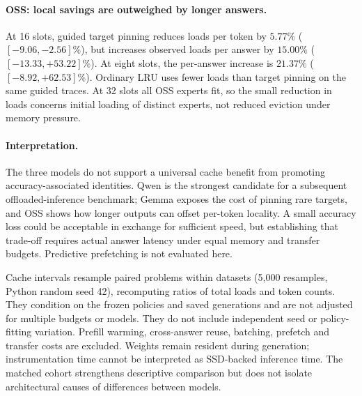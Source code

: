 \paragraph{OSS: local savings are outweighed by longer answers.}
At 16 slots, guided target pinning reduces loads per token by $5.77\%$
($[-9.06,-2.56]\%$), but increases observed loads per answer by $15.00\%$
($[-13.33,+53.22]\%$). At eight slots, the per-answer increase is
$21.37\%$ ($[-8.92,+62.53]\%$). Ordinary LRU uses fewer loads than target
pinning on the same guided traces. At 32 slots all OSS experts fit, so the
small reduction in loads concerns initial loading of distinct experts,
not reduced eviction under memory pressure.

\paragraph{Interpretation.}
The three models do not support a universal cache benefit from promoting
accuracy-associated identities. Qwen is the strongest candidate for a
subsequent offloaded-inference benchmark; Gemma exposes the cost of pinning
rare targets, and OSS shows how longer outputs can offset per-token locality.
A small accuracy loss could be acceptable in exchange for sufficient speed,
but establishing that trade-off requires actual answer latency under equal
memory and transfer budgets. Predictive prefetching is not evaluated here.

Cache intervals resample paired problems within datasets (5,000 resamples,
Python random seed 42), recomputing ratios of total loads and token counts.
They condition on the frozen policies and saved generations and are not
adjusted for multiple budgets or models. They do not include independent
seed or policy-fitting variation. Prefill warming, cross-answer reuse,
batching, prefetch and transfer costs are excluded. Weights remain resident
during generation; instrumentation time cannot be interpreted as SSD-backed
inference time. The matched cohort strengthens descriptive comparison but
does not isolate architectural causes of differences between models.
